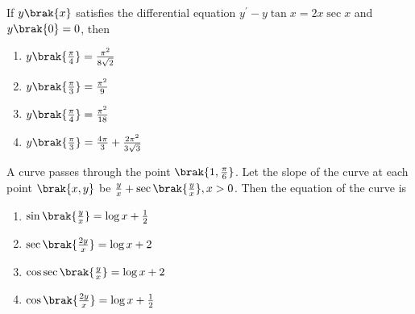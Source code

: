 \item  If $y\brak{x}$ satisfies the differential equation $y^\prime - y \tan x = 2x \sec x $ and $y\brak{0} = 0 $, then \hfill {}

\begin{multicols}{2}
\begin{enumerate}
    \item $ y\brak{\frac{\pi}{4}} = \frac{\pi^2}{8\sqrt{2}} $
    \item $ y\brak{\frac{\pi}{3}} = \frac{\pi^2}{9} $
    \item $ y\brak{\frac{\pi}{4}} = \frac{\pi^2}{18} $
    \item $ y\brak{\frac{\pi}{3}} = \frac{4\pi}{3} + \frac{2\pi^2}{3\sqrt{3}} $
\end{enumerate}
\end{multicols}

\item A curve passes through the point $ \brak{1,\frac{\pi}{6}} $. Let the slope of the curve at each point $ \brak{x, y} $ be $ \frac{y}{x} + \sec\brak{\frac{y}{x}}, x > 0 $. Then the equation of the curve is \hfill {}

\begin{multicols}{2}
\begin{enumerate}
    \item $ \sin\brak{\frac{y}{x}} = \log x + \frac{1}{2} $
    \item $\sec\brak{\frac{2y}{x}} = \log x + 2$
    \item $\cos\sec\brak{\frac{y}{x}} = \log x + 2 $
    \item $ \cos\brak{\frac{2y}{x}} = \log x + \frac{1}{2} $
\end{enumerate}
\end{multicols}
